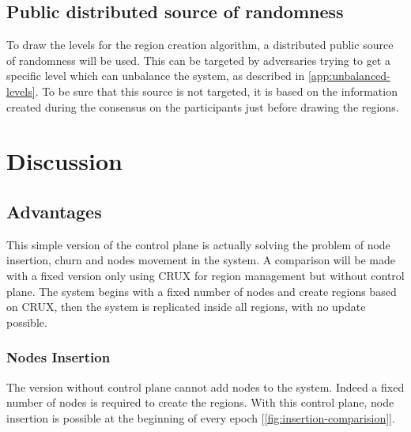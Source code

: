 \documentclass[a4paper,11pt,oneside]{report}
\begin{document}
\subsection{Public distributed source of randomness}
To draw the levels for the region creation algorithm, a distributed public
source of randomness will be used. This can be targeted by adversaries trying to
get a specific level which can unbalance the system, as described in \autoref{app:unbalanced-levels}. To be sure that this
source is not targeted, it is  based on the information created during the
consensus on the participants just before drawing the regions. 

\FloatBarrier
\section{Discussion}
\subsection{Advantages}
This simple version of the control plane is actually solving the problem of
node insertion, churn and nodes movement in the system. A comparison will be made with a fixed
version only using CRUX for region management but without control plane. The
system begins with a fixed number of nodes and create regions based on CRUX,
then the system is replicated inside all regions, with no update possible.

\subsubsection{Nodes Insertion}
The version without control plane cannot add nodes to the system. Indeed a
fixed number of nodes is required to create the regions. With this control
plane, node insertion is possible at the beginning of every epoch
[\autoref{fig:insertion-comparision}].
\end{document}
